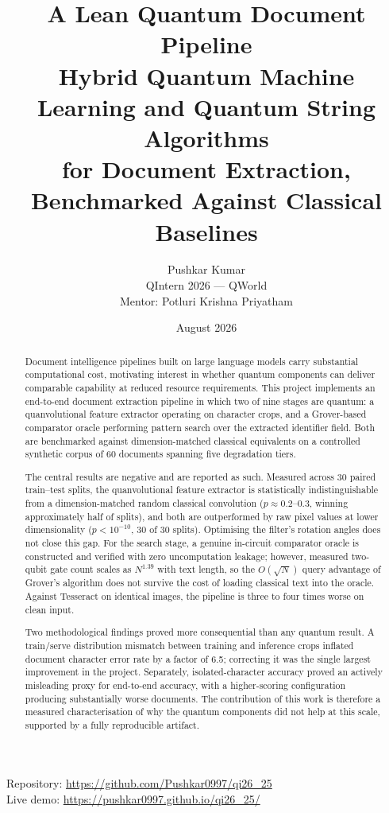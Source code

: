 \documentclass[11pt,a4paper]{article}
\title{\vspace{-1.5cm}\textbf{A Lean Quantum Document Pipeline}\\[0.3cm]
\large Hybrid Quantum Machine Learning and Quantum String Algorithms\\
for Document Extraction, Benchmarked Against Classical Baselines}
\author{Pushkar Kumar\\[0.2cm]
\normalsize QIntern 2026 --- QWorld\\
\normalsize Mentor: Potluri Krishna Priyatham}
\date{August 2026}
\begin{document}
\maketitle

\begin{center}
\small
Repository: \url{https://github.com/Pushkar0997/qi26_25}\\
Live demo: \url{https://pushkar0997.github.io/qi26_25/}
\end{center}

\vspace{0.3cm}

\begin{abstract}
\noindent
Document intelligence pipelines built on large language models carry substantial
computational cost, motivating interest in whether quantum components can
deliver comparable capability at reduced resource requirements. This project
implements an end-to-end document extraction pipeline in which two of nine
stages are quantum: a quanvolutional feature extractor operating on character
crops, and a Grover-based comparator oracle performing pattern search over the
extracted identifier field. Both are benchmarked against dimension-matched
classical equivalents on a controlled synthetic corpus of 60 documents spanning
five degradation tiers.

The central results are negative and are reported as such. Measured across 30
paired train--test splits, the quanvolutional feature extractor is statistically
indistinguishable from a dimension-matched random classical convolution
($p \approx 0.2$--$0.3$, winning approximately half of splits), and both are
outperformed by raw pixel values at lower dimensionality ($p < 10^{-10}$, 30 of
30 splits). Optimising the filter's rotation angles does not close this gap. For
the search stage, a genuine in-circuit comparator oracle is constructed and
verified with zero uncomputation leakage; however, measured two-qubit gate count
scales as $N^{1.39}$ with text length, so the $O(\sqrt{N})$ query advantage of
Grover's algorithm does not survive the cost of loading classical text into the
oracle. Against Tesseract on identical images, the pipeline is three to four
times worse on clean input.

Two methodological findings proved more consequential than any quantum result. A
train/serve distribution mismatch between training and inference crops inflated
document character error rate by a factor of 6.5; correcting it was the single
largest improvement in the project. Separately, isolated-character accuracy
proved an actively misleading proxy for end-to-end accuracy, with a
higher-scoring configuration producing substantially worse documents. The
contribution of this work is therefore a measured characterisation of why the
quantum components did not help at this scale, supported by a fully reproducible
artifact.
\end{abstract}
\end{document}
